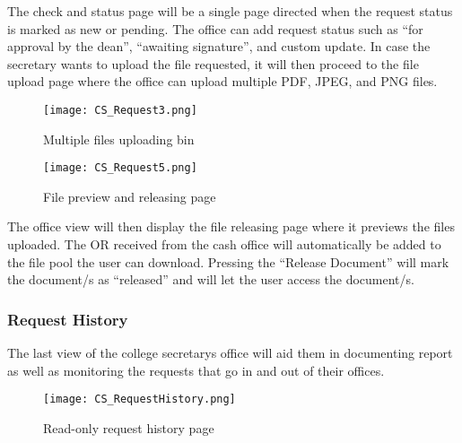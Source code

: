 The check and status page will be a single page directed when the request status is marked as new or pending. The office can add request status such as “for approval by the dean”, “awaiting signature”, and custom update. In case the secretary wants to upload the file requested, it will then proceed to the file upload page where the office can upload multiple PDF, JPEG, and PNG files.

\begin{figure}[h]
    \centering 
    \begin{minipage}[c]{0.5\linewidth}
        \centering
        \texttt{[image: CS\_Request3.png]}
        \caption{Multiple files uploading bin}
        \label{fig:CS_Request3}
    \end{minipage}
\end{figure}

\begin{figure}[h]
    \centering 
    \begin{minipage}[c]{0.5\linewidth}
        \centering
        \texttt{[image: CS\_Request5.png]}
        \caption{File preview and releasing page}
        \label{fig:CS_Request5}
    \end{minipage}
\end{figure}

The office view will then display the file releasing page where it previews the files uploaded. The OR received from the cash office will automatically be added to the file pool the user can download. Pressing the “Release Document” will mark the document/s as “released” and will let the user access the document/s.

\subsubsection{Request History}

The last view of the college secretary\textsc{}s office will aid them in documenting report as well as monitoring the requests that go in and out of their offices.

\begin{figure}[h]
    \centering 
    \begin{minipage}[c]{0.5\linewidth}
        \centering
        \texttt{[image: CS\_RequestHistory.png]}
        \caption{Read-only request history page}
        \label{fig:CS_RequestHistory}
    \end{minipage}
\end{figure}

